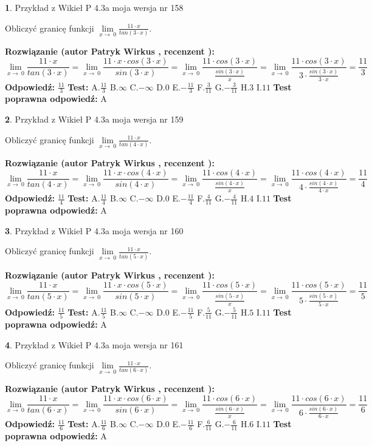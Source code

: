 \documentclass[12pt, a4paper]{article}
\theoremstyle{definition} %
\newtheorem{zad}{}
\newcommand{\zadStart}[1]{\begin{zad}#1\newline}
\newcommand{\zadStop}{\end{zad}}
\newcommand{\rozwStart}[2]{\noindent \textbf{Rozwiązanie (autor #1 , recenzent #2): }\newline}
\newcommand{\rozwStop}{\newline}
\newcommand{\odpStart}{\noindent \textbf{Odpowiedź:}\newline}
\newcommand{\odpStop}{\newline}
\newcommand{\testStart}{\noindent \textbf{Test:}\newline}
\newcommand{\testStop}{\newline}
\newcommand{\kluczStart}{\noindent \textbf{Test poprawna odpowiedź:}\newline}
\newcommand{\kluczStop}{\newline}
\begin{document}
\zadStart{Przykład z Wikieł P 4.3a moja wersja nr 158}


Obliczyć granicę funkcji $\lim\limits_{x\to\ 0}\frac{11 \cdot x}{tan(3 \cdot x)}$.
\zadStop
\rozwStart{Patryk Wirkus}{}
$$\lim\limits_{x\to\ 0}\frac{11 \cdot x}{tan(3 \cdot x)}=\lim\limits_{x\to\ 0}\frac{11 \cdot x \cdot cos(3 \cdot x)}{sin(3 \cdot x)}=\lim\limits_{x\to\ 0}\frac{11 \cdot cos(3 \cdot x)}{\frac{sin(3 \cdot x)}{x}}=\lim\limits_{x\to\ 0}\frac{11 \cdot cos(3 \cdot x)}{3 \cdot \frac{sin(3 \cdot x)}{3 \cdot x}} = \frac{11}{3}$$
\rozwStop
\odpStart
$\frac{11}{3}$
\odpStop
\testStart
A.$\frac{11}{3}$
B.$\infty$
C.$-\infty$
D.$0$
E.$-\frac{11}{3}$
F.$\frac{3}{11}$
G.$-\frac{3}{11}$
H.$3$
I.$11$
\testStop
\kluczStart
A
\kluczStop



\zadStart{Przykład z Wikieł P 4.3a moja wersja nr 159}


Obliczyć granicę funkcji $\lim\limits_{x\to\ 0}\frac{11 \cdot x}{tan(4 \cdot x)}$.
\zadStop
\rozwStart{Patryk Wirkus}{}
$$\lim\limits_{x\to\ 0}\frac{11 \cdot x}{tan(4 \cdot x)}=\lim\limits_{x\to\ 0}\frac{11 \cdot x \cdot cos(4 \cdot x)}{sin(4 \cdot x)}=\lim\limits_{x\to\ 0}\frac{11 \cdot cos(4 \cdot x)}{\frac{sin(4 \cdot x)}{x}}=\lim\limits_{x\to\ 0}\frac{11 \cdot cos(4 \cdot x)}{4 \cdot \frac{sin(4 \cdot x)}{4 \cdot x}} = \frac{11}{4}$$
\rozwStop
\odpStart
$\frac{11}{4}$
\odpStop
\testStart
A.$\frac{11}{4}$
B.$\infty$
C.$-\infty$
D.$0$
E.$-\frac{11}{4}$
F.$\frac{4}{11}$
G.$-\frac{4}{11}$
H.$4$
I.$11$
\testStop
\kluczStart
A
\kluczStop



\zadStart{Przykład z Wikieł P 4.3a moja wersja nr 160}


Obliczyć granicę funkcji $\lim\limits_{x\to\ 0}\frac{11 \cdot x}{tan(5 \cdot x)}$.
\zadStop
\rozwStart{Patryk Wirkus}{}
$$\lim\limits_{x\to\ 0}\frac{11 \cdot x}{tan(5 \cdot x)}=\lim\limits_{x\to\ 0}\frac{11 \cdot x \cdot cos(5 \cdot x)}{sin(5 \cdot x)}=\lim\limits_{x\to\ 0}\frac{11 \cdot cos(5 \cdot x)}{\frac{sin(5 \cdot x)}{x}}=\lim\limits_{x\to\ 0}\frac{11 \cdot cos(5 \cdot x)}{5 \cdot \frac{sin(5 \cdot x)}{5 \cdot x}} = \frac{11}{5}$$
\rozwStop
\odpStart
$\frac{11}{5}$
\odpStop
\testStart
A.$\frac{11}{5}$
B.$\infty$
C.$-\infty$
D.$0$
E.$-\frac{11}{5}$
F.$\frac{5}{11}$
G.$-\frac{5}{11}$
H.$5$
I.$11$
\testStop
\kluczStart
A
\kluczStop



\zadStart{Przykład z Wikieł P 4.3a moja wersja nr 161}


Obliczyć granicę funkcji $\lim\limits_{x\to\ 0}\frac{11 \cdot x}{tan(6 \cdot x)}$.
\zadStop
\rozwStart{Patryk Wirkus}{}
$$\lim\limits_{x\to\ 0}\frac{11 \cdot x}{tan(6 \cdot x)}=\lim\limits_{x\to\ 0}\frac{11 \cdot x \cdot cos(6 \cdot x)}{sin(6 \cdot x)}=\lim\limits_{x\to\ 0}\frac{11 \cdot cos(6 \cdot x)}{\frac{sin(6 \cdot x)}{x}}=\lim\limits_{x\to\ 0}\frac{11 \cdot cos(6 \cdot x)}{6 \cdot \frac{sin(6 \cdot x)}{6 \cdot x}} = \frac{11}{6}$$
\rozwStop
\odpStart
$\frac{11}{6}$
\odpStop
\testStart
A.$\frac{11}{6}$
B.$\infty$
C.$-\infty$
D.$0$
E.$-\frac{11}{6}$
F.$\frac{6}{11}$
G.$-\frac{6}{11}$
H.$6$
I.$11$
\testStop
\kluczStart
A
\kluczStop
\end{document}
